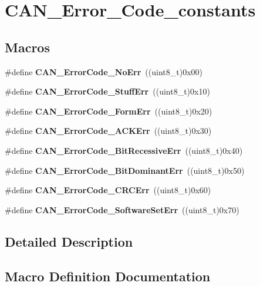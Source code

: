 \section{C\+A\+N\+\_\+\+Error\+\_\+\+Code\+\_\+constants}
\label{group__CAN__Error__Code__constants}
\subsection*{Macros}
\begin{DoxyCompactItemize}
\item 
\#define \textbf{ C\+A\+N\+\_\+\+Error\+Code\+\_\+\+No\+Err}~((uint8\+\_\+t)0x00)
\item 
\#define \textbf{ C\+A\+N\+\_\+\+Error\+Code\+\_\+\+Stuff\+Err}~((uint8\+\_\+t)0x10)
\item 
\#define \textbf{ C\+A\+N\+\_\+\+Error\+Code\+\_\+\+Form\+Err}~((uint8\+\_\+t)0x20)
\item 
\#define \textbf{ C\+A\+N\+\_\+\+Error\+Code\+\_\+\+A\+C\+K\+Err}~((uint8\+\_\+t)0x30)
\item 
\#define \textbf{ C\+A\+N\+\_\+\+Error\+Code\+\_\+\+Bit\+Recessive\+Err}~((uint8\+\_\+t)0x40)
\item 
\#define \textbf{ C\+A\+N\+\_\+\+Error\+Code\+\_\+\+Bit\+Dominant\+Err}~((uint8\+\_\+t)0x50)
\item 
\#define \textbf{ C\+A\+N\+\_\+\+Error\+Code\+\_\+\+C\+R\+C\+Err}~((uint8\+\_\+t)0x60)
\item 
\#define \textbf{ C\+A\+N\+\_\+\+Error\+Code\+\_\+\+Software\+Set\+Err}~((uint8\+\_\+t)0x70)
\end{DoxyCompactItemize}


\subsection{Detailed Description}


\subsection{Macro Definition Documentation}
\mbox{\label{group__CAN__Error__Code__constants_gad47e6af0116d1b6de85e29286c0b8607}} 
